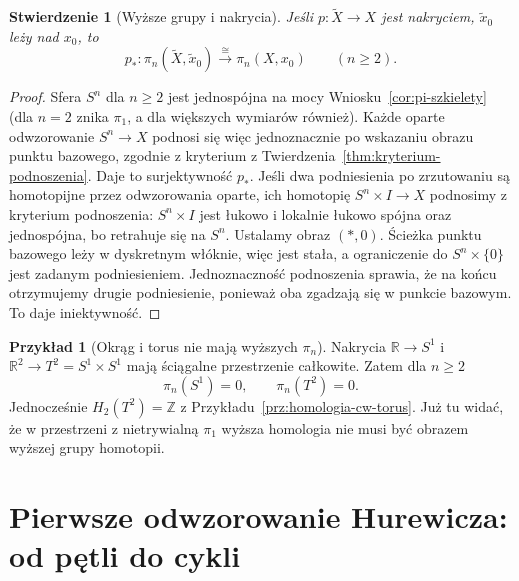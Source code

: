 \documentclass[11pt,a4paper,oneside]{report}
\newcommand{\R}{\mathbb{R}}
\newcommand{\Z}{\mathbb{Z}}
\theoremstyle{plain}
\newtheorem{stwierdzenie}[twierdzenie]{Stwierdzenie}
\theoremstyle{definition}
\newtheorem{przyklad}[twierdzenie]{Przykład}
\theoremstyle{remark}
\begin{document}
\begin{stwierdzenie}[Wyższe grupy i nakrycia]
\label{prop:pi-n-nakrycie}
Jeśli $p:\widetilde X\to X$
jest nakryciem, $\widetilde x_0$
leży nad $x_0$, to
\[
 p_*:\pi_n(\widetilde X,\widetilde x_0)
 \xrightarrow{\ \cong\ }
 \pi_n(X,x_0)\qquad(n\geq2).
\]
\end{stwierdzenie}
\begin{proof}
Sfera $S^n$ dla $n\geq2$
jest jednospójna na mocy
Wniosku~\ref{cor:pi-szkielety}
(dla $n=2$ znika $\pi_1$,
a dla większych wymiarów
również). Każde oparte
odwzorowanie $S^n\to X$ podnosi
się więc jednoznacznie
po wskazaniu obrazu
punktu bazowego,
zgodnie z kryterium
z Twierdzenia~\ref{thm:kryterium-podnoszenia}.
Daje to surjektywność $p_*$.
Jeśli dwa podniesienia
po zrzutowaniu są
homotopijne przez odwzorowania oparte,
ich homotopię
$S^n\times I\to X$ podnosimy z kryterium podnoszenia:
$S^n\times I$ jest łukowo i lokalnie łukowo spójna oraz jednospójna,
bo retrahuje się na $S^n$. Ustalamy obraz $(\ast,0)$.
Ścieżka punktu bazowego leży w dyskretnym włóknie, więc jest stała,
a ograniczenie do $S^n\times\{0\}$ jest zadanym podniesieniem.
Jednoznaczność podnoszenia
sprawia, że na końcu
otrzymujemy drugie
podniesienie, ponieważ
oba zgadzają się w
punkcie bazowym.
To daje iniektywność.
\end{proof}

\begin{przyklad}[Okrąg i torus nie mają wyższych $\pi_n$]
\label{prz:pi-torus}
Nakrycia $\R\to S^1$ i
$\R^2\to T^2=S^1\times S^1$
mają ściągalne przestrzenie
całkowite. Zatem dla $n\geq2$
\[
 \pi_n(S^1)=0,\qquad
 \pi_n(T^2)=0.
\]
Jednocześnie
$H_2(T^2)=\Z$ z
Przykładu~\ref{prz:homologia-cw-torus}.
Już tu widać, że w
przestrzeni z nietrywialną
$\pi_1$ wyższa homologia
nie musi być obrazem
wyższej grupy homotopii.
\end{przyklad}

\section{Pierwsze odwzorowanie Hurewicza: od pętli do cykli}
\label{sec:hurewicz-jeden}
\end{document}
